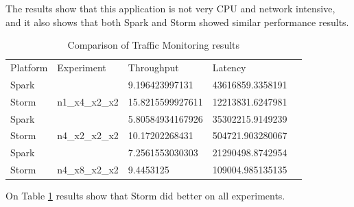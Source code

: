 \documentclass[ppgc,diss,english]{iiufrgs}
\begin{document}
The results show that this application is not very CPU and network intensive, and it also shows that both Spark and Storm showed similar performance results.

\begin{table}[H]
\tiny
\centering
\caption{Comparison of Traffic Monitoring results}
\label{table:traffic-monitoring-results}
\begin{tabular}{|l|l|l|l|l}
\cline{1-4}
Platform & Experiment                       & Throughput                               & Latency                                  &  \\ \cline{1-4}
Spark    &                                  & 9.196423997131                           & 43616859.3358191                         &  \\ \cline{1-1} \cline{3-4}
Storm    & \multirow{-2}{*}{n1\_x4\_x2\_x2} & \cellcolor[HTML]{67FD9A}15.8215599927611 & \cellcolor[HTML]{67FD9A}12213831.6247981 &  \\ \cline{1-4}
Spark    &                                  & 5.80584934167926                         & 35302215.9149239                         &  \\ \cline{1-1} \cline{3-4}
Storm    & \multirow{-2}{*}{n4\_x2\_x2\_x2} & \cellcolor[HTML]{67FD9A}10.17202268431   & \cellcolor[HTML]{67FD9A}504721.903280067 &  \\ \cline{1-4}
Spark    &                                  & 7.2561553030303                          & 21290498.8742954                         &  \\ \cline{1-1} \cline{3-4}
Storm    & \multirow{-2}{*}{n4\_x8\_x2\_x2} & \cellcolor[HTML]{67FD9A}9.4453125        & \cellcolor[HTML]{67FD9A}109004.985135135 &  \\ \cline{1-4}
\end{tabular}
\end{table}

On Table \ref{table:traffic-monitoring-results} results show that Storm did better on all experiments.




\end{document}
